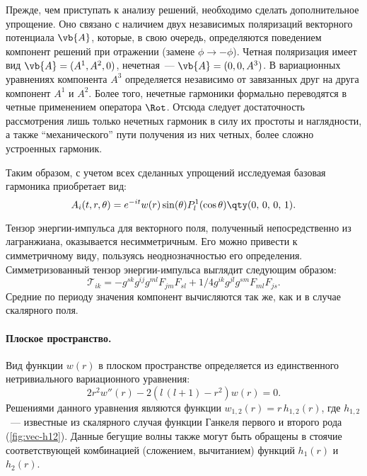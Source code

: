 \documentclass[\docroot/reports/draft/report.tex]{subfiles}
\begin{document}
    Прежде, чем приступать к анализу решений, необходимо сделать дополнительное упрощение. Оно связано с наличием двух независимых поляризаций векторного потенциала $\vb{A}$, которые, в свою очередь, определяются поведением компонент решений при отражении (замене $\phi \to -\phi$). Четная поляризация имеет вид $\vb{A} = (A^1, A^2, 0)$, нечетная~--- $\vb{A} = (0, 0, A^3)$. В вариационных уравнениях компонента $A^3$ определяется независимо от завязанных друг на друга компонент $A^1$ и $A^2$. Более того, нечетные гармоники формально переводятся в четные применением оператора $\Rot$. Отсюда следует достаточность рассмотрения лишь только нечетных гармоник в силу их простоты и наглядности, а также \enquote{механического} пути получения из них четных, более сложно устроенных гармоник.

    Таким образом, с учетом всех сделанных упрощений исследуемая базовая гармоника приобретает вид:
    \begin{equation*}
        A_i(t,r,\theta) = e^{-i t} w(r) \sin(\theta) P_l^1(\cos\theta) \qty(0,\,0,\,0,\,1).
    \end{equation*}

    Тензор энергии-импульса для векторного поля, полученный непосредственно из лагранжиана, оказывается несимметричным. Его можно привести к симметричному виду, пользуясь неоднозначностью его определения. Симметризованный тензор энергии-импульса выглядит следующим образом:
    \begin{equation*}
        \mathcal{T}_{ik} = -g^{sk} g^{ij} g^{ml} F_{jm} F_{sl} + 1/4 g^{ik} g^{jl} g^{sm} F_{ml} F_{js} .
    \end{equation*}
    Средние по периоду значения компонент вычисляются так же, как и в случае скалярного поля.

    \paragraph{Плоское пространство.}

        Вид функции $w(r)$ в плоском пространстве определяется из единственного нетривиального вариационного уравнения:
        \begin{equation}\label{eq:vec-m-eq}
            2 r^2 w''(r) - 2 (l\,(l + 1) - r^2) w(r) = 0.
        \end{equation}
        Решениями данного уравнения являются функции $w_{1,2}(r) = r\,h_{1,2}(r)$, где $h_{1,2}$~--- известные из скалярного случая функции Ганкеля первого и второго рода (\autoref{fig:vec-h12}). Данные бегущие волны также могут быть обращены в стоячие соответствующей комбинацией (сложением, вычитанием) функций $h_1(r)$ и $h_2(r)$.
\end{document}
